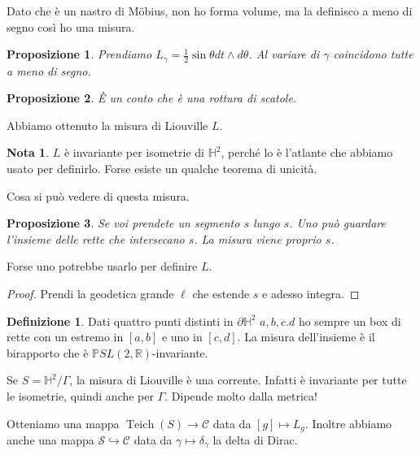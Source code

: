 \documentclass[a4paper]{article}
\newtheorem{proposition}{Proposizione}
\theoremstyle{definition}
\newtheorem{definition}{Definizione}
\newtheorem{remark}{Nota}
\DeclareMathOperator{\Teich}{Teich}
\begin{document}
    Dato che è un nastro di Möbius, non ho forma volume, ma la definisco a meno di segno così ho una misura.

    \begin{proposition}
        Prendiamo $L_{\gamma} = \frac12 \sin \theta dt \wedge d\theta$. Al variare di $\gamma$ coincidono tutte a meno di segno.
    \end{proposition}

    \begin{proposition}
        È un conto che è una rottura di scatole.
    \end{proposition}

    Abbiamo ottenuto la misura di Liouville $L$.

    \begin{remark}
        $L$ è invariante per isometrie di $\mathbb H^2$, perché lo è l'atlante che abbiamo usato per definirlo. Forse esiste un qualche teorema di unicità.
    \end{remark}

    Cosa si può vedere di questa misura.

    \begin{proposition}
        Se voi prendete un segmento $s$ lungo $s$. Uno può guardare l'insieme delle rette che intersecano $s$. La misura viene proprio $s$.
    \end{proposition}

    Forse uno potrebbe usarlo per definire $L$.

    \begin{proof}
        Prendi la geodetica grande $\ell$ che estende $s$ e adesso integra.
    \end{proof}

    \begin{definition}
        Dati quattro punti distinti in $\partial \mathbb H^2$ $a,b,c.d$ ho sempre un box di rette con un estremo in $[a,b]$ e uno in $[c,d]$. La misura dell'insieme è il birapporto che è $\mathbb P SL(2,\mathbb R)$-invariante.
    \end{definition}

    Se $S = \mathbb H^2 /\Gamma$, la misura di Liouville è una corrente. Infatti è invariante per tutte le isometrie, quindi anche per $\Gamma$. Dipende molto dalla metrica!

    Otteniamo una mappa $\Teich(S) \to \mathcal C$ data da $[g] \mapsto L_{g}$. Inoltre abbiamo anche una mappa $\mathcal S \hookrightarrow \mathcal C$ data da $\gamma \mapsto \delta_{\gamma}$ la delta di Dirac.
\end{document}
